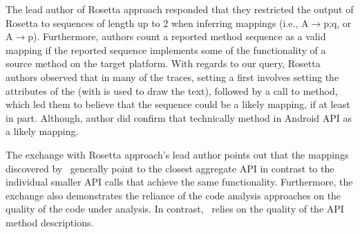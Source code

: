 The lead author of Rosetta approach responded that they restricted the output of
Rosetta to sequences of length up to 2 when inferring mappings (i.e., {A$\rightarrow$p;q}, or {A$\rightarrow$p}). Furthermore, authors count a reported method sequence as a valid mapping
if the reported sequence implements some of the functionality of a source method on the target platform.
With regards to our query, Rosetta authors observed that in many of the traces, setting a  first involves setting the attributes of the  (with is used to draw the text), followed by a call to  method, which led them to believe that the sequence    could be a likely mapping, if at least in part.
Although, author did confirm that technically  method in Android API as a likely mapping.

The exchange with Rosetta approach's lead author points out that
the mappings discovered by \tool\ generally point to
the closest aggregate API in contrast to the individual smaller API calls
that achieve the same functionality.
Furthermore, the exchange also demonstrates the reliance of the
code analysis approaches on the quality of the code under analysis.
In contrast, \tool\ relies on the quality of the API method descriptions.



